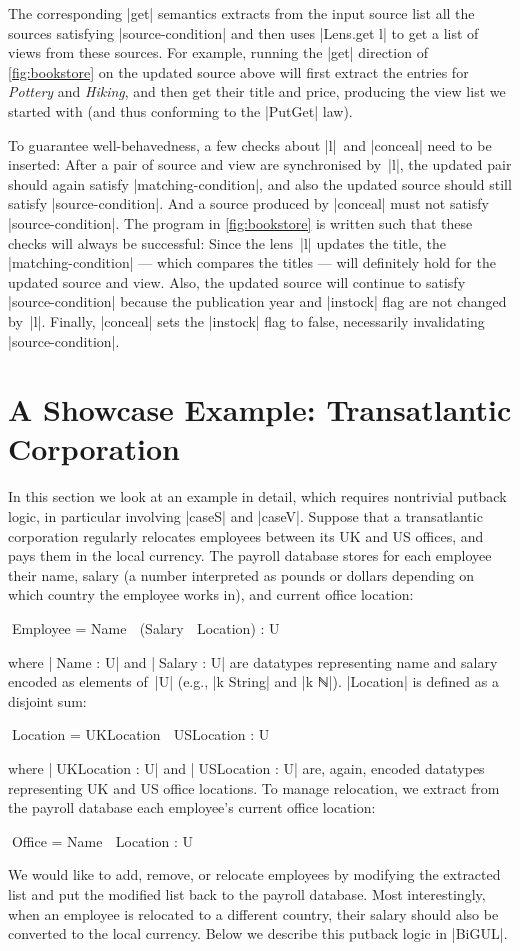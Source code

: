 \documentclass{sigplanconf}
\begin{document}
The corresponding |get| semantics extracts from the input source list all the sources satisfying |source-condition| and then uses |Lens.get l| to get a list of views from these sources.
For example, running the |get| direction of \autoref{fig:bookstore} on the updated source above will first extract the entries for \textsl{Pottery} and \textsl{Hiking}, and then get their title and price, producing the view list we started with (and thus conforming to the |PutGet| law).

To guarantee well-behavedness, a few checks about |l|~and |conceal| need to be inserted:
After a pair of source and view are synchronised by~|l|, the updated pair should again satisfy |matching-condition|, and also the updated source should still satisfy |source-condition|.
And a source produced by |conceal| must not satisfy |source-condition|.
The program in \autoref{fig:bookstore} is written such that these checks will always be successful:
Since the lens~|l| updates the title, the |matching-condition| --- which compares the titles --- will definitely hold for the updated source and view.
Also, the updated source will continue to satisfy |source-condition| because the publication year and |instock| flag are not changed by~|l|.
Finally, |conceal| sets the |instock| flag to false, necessarily invalidating |source-condition|.

\section{A Showcase Example: Transatlantic Corporation}
\label{sec:transatlantic-corporation}

In this section we look at an example in detail, which requires nontrivial putback logic, in particular involving |caseS| and |caseV|.
Suppose that a transatlantic corporation regularly relocates employees between its UK and US offices, and pays them in the local currency.
The payroll database stores for each employee their name, salary (a number interpreted as pounds or dollars depending on which country the employee works in), and current office location:
\begin{code}
^^^Employee = Name ⊗ (Salary ⊗ Location) : U
\end{code}
where |^^^Name : U| and |^^^Salary : U| are datatypes representing name and salary encoded as elements of~|U| (e.g., |k String| and |k ℕ|).
|Location| is defined as a disjoint sum:
\begin{code}
^^^Location = UKLocation ⊕ USLocation : U
\end{code}
where |^^^UKLocation : U| and |^^^USLocation : U| are, again, encoded datatypes representing UK and US office locations.
To manage relocation, we extract from the payroll database each employee's current office location:
\begin{code}
^^^Office = Name ⊗ Location : U
\end{code}
We would like to add, remove, or relocate employees by modifying the extracted list and put the modified list back to the payroll database.
Most interestingly, when an employee is relocated to a different country, their salary should also be converted to the local currency.
Below we describe this putback logic in |BiGUL|.
\end{document}
